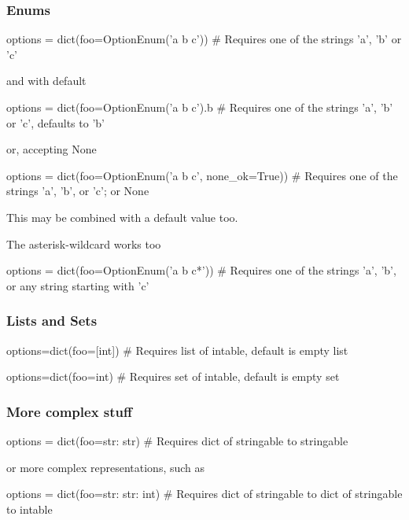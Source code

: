\subsubsection*{Enums}
\begin{python}
  options = dict(foo=OptionEnum('a b c'))
  # Requires one of the strings 'a', 'b' or 'c'
\end{python}
and with default

\begin{python}
  options = dict(foo=OptionEnum('a b c').b
   # Requires one of the strings 'a', 'b' or 'c', defaults to 'b'
\end{python}
or, accepting None

\begin{python}
options = dict(foo=OptionEnum('a b c', none_ok=True))
# Requires one of the strings 'a', 'b', or 'c'; or None
\end{python}
This may be combined with a default value too.

The asterisk-wildcard works too

\begin{python}
  options = dict(foo=OptionEnum('a b c*'))
  # Requires one of the strings 'a', 'b', or any string starting with 'c'
\end{python}



\subsubsection*{Lists and Sets}
\begin{python}
options=dict(foo=[int])
# Requires list of intable, default is empty list
\end{python}

\begin{python}
options=dict(foo={int})
# Requires set of intable, default is empty set
\end{python}



\subsubsection*{More complex stuff}
\begin{python}
options = dict(foo={str: str})
# Requires dict of stringable to stringable
\end{python}
or more complex representations, such as

\begin{python}
options = dict(foo={str: {str: int}})
# Requires dict of stringable to dict of stringable to intable
\end{python}



